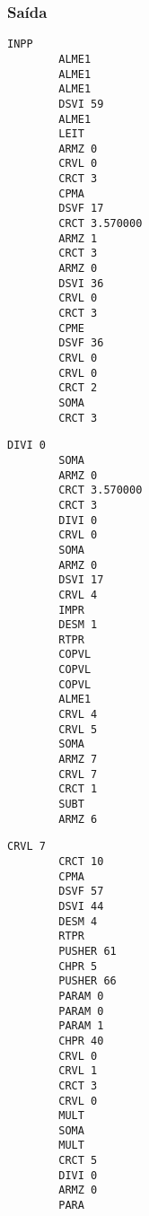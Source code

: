 \documentclass{article}
\begin{document}
		\subsubsection*{Saída} %
		\label{ssub:sa_da}
		\begin{center}
		\begin{minipage}[t]{0.3\textwidth}
		\begin{lstlisting}[firstnumber=0]
		INPP
		ALME1
		ALME1
		ALME1
		DSVI 59
		ALME1
		LEIT
		ARMZ 0
		CRVL 0
		CRCT 3
		CPMA
		DSVF 17
		CRCT 3.570000
		ARMZ 1
		CRCT 3
		ARMZ 0
		DSVI 36
		CRVL 0
		CRCT 3
		CPME
		DSVF 36
		CRVL 0
		CRVL 0
		CRCT 2
		SOMA
		CRCT 3
		\end{lstlisting}
		\end{minipage}	
		\begin{minipage}[t]{0.3\textwidth}
		\begin{lstlisting}[firstnumber=26]
		DIVI 0
		SOMA
		ARMZ 0
		CRCT 3.570000
		CRCT 3
		DIVI 0
		CRVL 0
		SOMA
		ARMZ 0
		DSVI 17
		CRVL 4
		IMPR
		DESM 1
		RTPR
		COPVL
		COPVL
		COPVL
		ALME1
		CRVL 4
		CRVL 5
		SOMA
		ARMZ 7
		CRVL 7
		CRCT 1
		SUBT
		ARMZ 6
		\end{lstlisting}
		\end{minipage}
		\begin{minipage}[t]{0.3\textwidth}
		\begin{lstlisting}[firstnumber=52]
		CRVL 7
		CRCT 10
		CPMA
		DSVF 57
		DSVI 44
		DESM 4
		RTPR
		PUSHER 61
		CHPR 5
		PUSHER 66
		PARAM 0
		PARAM 0
		PARAM 1
		CHPR 40
		CRVL 0
		CRVL 1
		CRCT 3
		CRVL 0
		MULT
		SOMA
		MULT
		CRCT 5
		DIVI 0
		ARMZ 0
		PARA
		\end{lstlisting}
		\end{minipage}
		\end{center}
\end{document}

